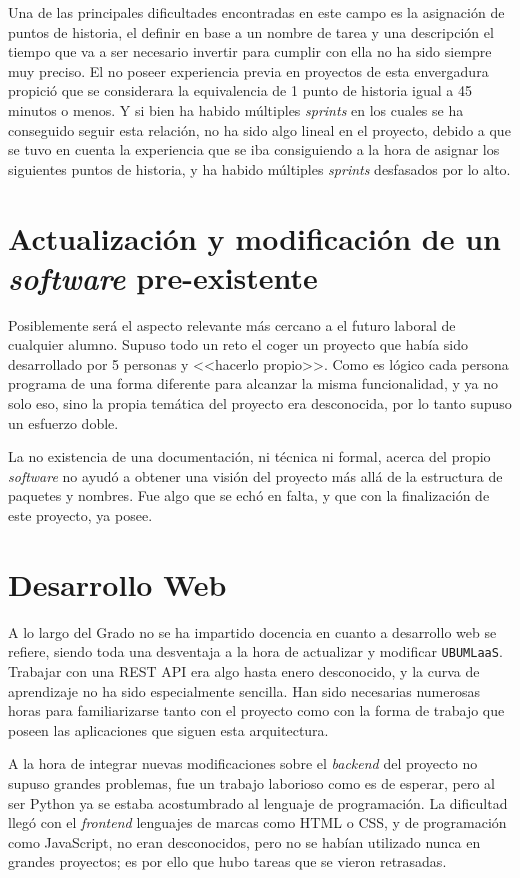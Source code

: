 Una de las principales dificultades encontradas en este campo es la asignación de puntos de historia, el definir en base a un nombre de tarea y una descripción el tiempo que va a ser necesario invertir para cumplir con ella no ha sido siempre muy preciso. El no poseer experiencia previa en proyectos de esta envergadura propició que se considerara la equivalencia de 1 punto de historia igual a 45 minutos o menos. Y si bien ha habido múltiples \textit{sprints} en los cuales se ha conseguido seguir esta relación, no ha sido algo lineal en el proyecto, debido a que se tuvo en cuenta la experiencia que se iba consiguiendo a la hora de asignar los siguientes puntos de historia, y ha habido múltiples \textit{sprints} desfasados por lo alto.

\section{Actualización y modificación de un \textit{software} pre-existente}
Posiblemente será el aspecto relevante más cercano a el futuro laboral de cualquier alumno. Supuso todo un reto el coger un proyecto que había sido desarrollado por 5 personas y <<hacerlo propio>>. Como es lógico cada persona programa de una forma diferente para alcanzar la misma funcionalidad, y ya no solo eso, sino la propia temática del proyecto era desconocida, por lo tanto supuso un esfuerzo doble.

La no existencia de una documentación, ni técnica ni formal, acerca del propio \textit{software} no ayudó a obtener una visión del proyecto más allá de la estructura de paquetes y nombres. Fue algo que se echó en falta, y que con la finalización de este proyecto, ya posee.

\section{Desarrollo Web}
A lo largo del Grado no se ha impartido docencia en cuanto a desarrollo web se refiere, siendo toda una desventaja a la hora de actualizar y modificar \texttt{UBUMLaaS}. Trabajar con una REST API era algo hasta enero desconocido, y la curva de aprendizaje no ha sido especialmente sencilla. Han sido necesarias numerosas horas para familiarizarse tanto con el proyecto como con la forma de trabajo que poseen las aplicaciones que siguen esta arquitectura.

A la hora de integrar nuevas modificaciones sobre el \textit{backend} del proyecto no supuso grandes problemas, fue un trabajo laborioso como es de esperar, pero al ser Python ya se estaba acostumbrado al lenguaje de programación. La dificultad llegó con el \textit{frontend} lenguajes de marcas como HTML o CSS, y de programación como JavaScript, no eran desconocidos, pero no se habían utilizado nunca en grandes proyectos; es por ello que hubo tareas que se vieron retrasadas. 

